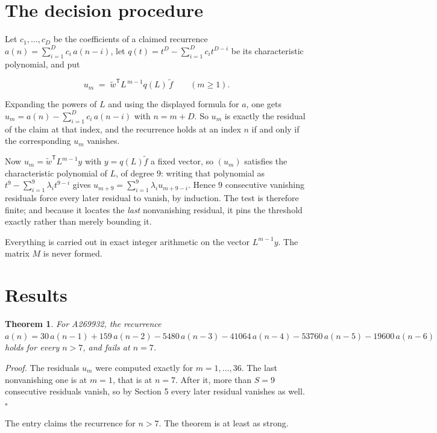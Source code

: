 \documentclass[11pt]{article}
\newtheorem{theorem}{Theorem}
\theoremstyle{definition}
\begin{document}
\section{The decision procedure}

Let $c_1,\dots,c_D$ be the coefficients of a claimed recurrence $a(n) = \sum_{i=1}^{D} c_i\,a(n-i)$, let $q(t) = t^{D} - \sum_{i=1}^{D} c_i t^{D-i}$ be its characteristic polynomial, and put

\[u_m \;=\; \tilde w^{\mathsf T} L^{\,m-1} q(L)\,\tilde f \qquad (m \ge 1).\]

Expanding the powers of $L$ and using the displayed formula for $a$, one gets $u_m = a(n) - \sum_{i=1}^{D} c_i\,a(n-i)$ with $n = m + D$. So $u_m$ is exactly the residual of the claim at that index, and the recurrence holds at an index $n$ if and only if the corresponding $u_m$ vanishes.

Now $u_m = \tilde w^{\mathsf T} L^{m-1} y$ with $y = q(L)\tilde f$ a fixed vector, so $(u_m)$ satisfies the characteristic polynomial of $L$, of degree $9$: writing that polynomial as $t^{9} - \sum_{i=1}^{9} \lambda_i t^{9-i}$ gives $u_{m+9} = \sum_{i=1}^{9} \lambda_i u_{m+9-i}$. Hence $9$ consecutive vanishing residuals force every later residual to vanish, by induction. The test is therefore finite; and because it locates the {\itshape last} nonvanishing residual, it pins the threshold exactly rather than merely bounding it.

Everything is carried out in exact integer arithmetic on the vector $L^{m-1}y$. The matrix $M$ is never formed.

\section{Results}

\begin{theorem} For A269932, the recurrence $a(n) = 30\,a(n-1) + 159\,a(n-2) - 5480\,a(n-3) - 41064\,a(n-4) - 53760\,a(n-5) - 19600\,a(n-6)$ holds for every $n > 7$, and fails at $n = 7$.\end{theorem}

{\itshape Proof.} The residuals $u_m$ were computed exactly for $m = 1,\dots,36$. The last nonvanishing one is at $m = 1$, that is at $n = 7$. After it, more than $S = 9$ consecutive residuals vanish, so by Section 5 every later residual vanishes as well. $\square$

The entry claims the recurrence for $n > 7$. The theorem is at least as strong.
\end{document}

